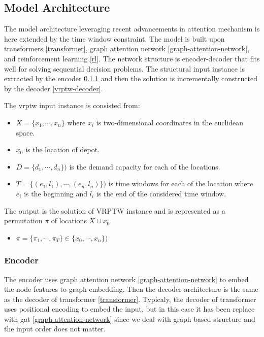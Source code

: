     \subsection{Model Architecture}\label{vrptw-model}
    The model architecture \cite{attention-route} leveraging recent advancements in attention mechanism is here extended by the time window constraint. The model is built upon transformers \ref{transformer}, graph attention network \ref{graph-attention-network}, and reinforcement learning \ref{rl}. The network structure is encoder-decoder that fits well for solving sequential decision problems. The structural input instance is extracted by the encoder \ref{vrptw-encoder} and then the solution is incrementally constructed by the decoder \ref{vrptw-decoder}.
    
    The \gls{vrptw} input instance is consisted from:
    \begin{itemize}\label{input-data}
        \item $X = \{x_1, \cdots, x_n\}$ where $x_i$ is two-dimensional coordinates in the euclidean space.
        \item $x_0$ is the location of depot.
        \item $D = \{d_1, \cdots, d_n\})$ is the demand capacity for each of the locations.
        \item $T = \{(e_1, l_1), \cdots, (e_n, l_n)\})$ is time windows for each of the location where $e_i$ is the beginning and $l_i$ is the end of the considered time window.
    \end{itemize}
    
    The output is the solution of VRPTW instance and is represented as a permutation $\pi$ of locations $X \cup x_0$.
    \begin{itemize}
        \item $\pi = \{\pi_1, \cdots, \pi_T\} \in \{x_0, \cdots, x_n\})$ 
    \end{itemize}
    
    \subsubsection{Encoder}\label{vrptw-encoder}
    The encoder uses graph attention network \ref{graph-attention-network} to embed the node features to graph embedding. Then the decoder architecture is the same as the decoder of transformer \ref{transformer}. Typicaly, the decoder of transformer uses positional encoding \cite{positional-encoding} to embed the input, but in this case it has been replace with \gls{gat} \ref{graph-attention-network} since we deal with graph-based structure and the input order does not matter.
    
